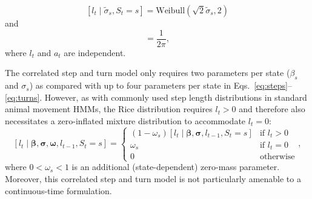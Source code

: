 \documentclass[12pt]{article}\usepackage[]{graphicx}\usepackage[]{xcolor}
\begin{document}
\begin{equation}
  [l_t \mid \tilde{\sigma}_s, S_t = s] = \text{Weibull}\left(\sqrt{2}\tilde{\sigma}_s, 2 \right)%
\end{equation}
and
\begin{equation}
  [a_t] = \frac{1}{2\pi},
\end{equation}
where $l_t$ and $a_t$ are independent. 

The correlated step and turn model only requires two parameters per state ($\beta_s$ and $\sigma_s$) as compared with up to four parameters per state in Eqs.\ \ref{eq:steps}--\ref{eq:turns}. However, as with commonly used step length distributions in standard animal movement HMMs, the Rice distribution requires $l_t>0$ and therefore also necessitates a zero-inflated mixture distribution to accommodate $l_t=0$:
\begin{equation}
  \label{eq:zi}
  \left[l_t \mid \boldsymbol{\beta}, \boldsymbol{\sigma}, \boldsymbol{\omega}, l_{t-1}, S_t = s\right] =
  \begin{cases}
  \left(1-\omega_s \right) \left[l_t \mid \boldsymbol{\beta}, \boldsymbol{\sigma}, l_{t-1}, S_t = s\right] & \text{if } l_t >0 \\
  \omega_s & \text{if } l_t = 0 \\
  0 & \text{otherwise}
  \end{cases},
\end{equation}
where $0<\omega_s<1$ is an additional (state-dependent) zero-mass parameter. Moreover, this correlated step and turn model is not particularly amenable to a continuous-time formulation.
\end{document}
